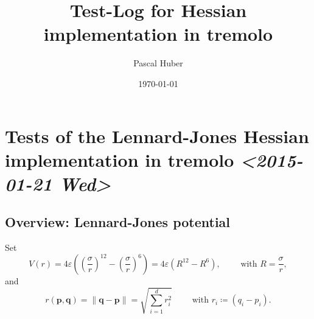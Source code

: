 \documentclass[a4paper]{article}
\author{Pascal Huber}
\date{\today}
\title{Test-Log for Hessian implementation in tremolo}
\newcommand{\boldp}{\boldsymbol{p}}
\newcommand{\boldq}{\boldsymbol{q}}
\begin{document}
\maketitle
\tableofcontents



\section{Tests of the Lennard-Jones Hessian implementation in tremolo \textit{<2015-01-21 Wed>}}
\label{sec-1}

\subsection{Overview: Lennard-Jones potential}
\label{sec-1-1}
Set
\begin{equation}
  \label{eq:1}
  V(r) =  4 \varepsilon \left( (\frac{\sigma}{r})^{12} -
    (\frac{\sigma}{r})^{6} \right) = 4 \varepsilon \left( R^{12} -
    R^6 \right),  \qquad \text{ with } R = \frac{\sigma}{r},
\end{equation}
and
\begin{equation}
  \label{eq:2}
  r(\boldp, \boldq) = \lVert \boldq - \boldp \rVert =
  \sqrt{\sum_{i=1}^d r_i^2} \qquad \text{ with } r_i \coloneqq (q_i - p_i).
\end{equation}
\end{document}

